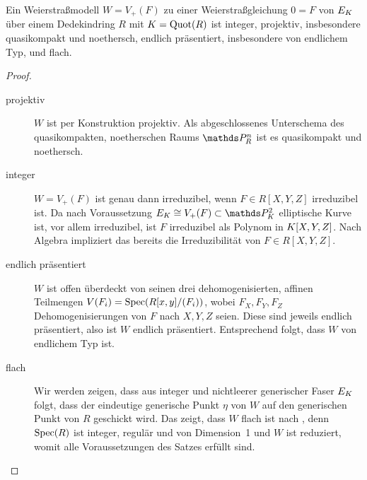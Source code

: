 \begin{Lemma}\label{thm:eigweierstrassmodelle}
  Ein Weierstraßmodell $W=V_+(F)$ zu einer Weierstraßgleichung $0=F$
  von $E_{K}$ über einem Dedekindring $R$ mit $K=\operatorname{Quot}(R)$ ist
  integer,
  projektiv, insbesondere quasikompakt und noethersch,
  endlich präsentiert, insbesondere von endlichem Typ, und
  flach.
  \begin{proof}
    \begin{description}
    \item[projektiv] $W$ ist per Konstruktion projektiv. Als
      abgeschlossenes Unterschema des quasikompakten, noetherschen Raums
      $\P_R^n$ ist es quasikompakt und noethersch.
    \item[integer]
      $W=V_+(F)$ ist genau dann irreduzibel, wenn $F\in R[X,Y,Z]$
      irreduzibel ist.
      Da nach Voraussetzung $E_\K\cong V_+(F)\subset\P_\K^2$
      elliptische Kurve ist, vor allem irreduzibel, ist $F$ irreduzibel
      als Polynom in $K[X,Y,Z]$. Nach Algebra impliziert das bereits
      die Irreduzibilität von $F\in R[X,Y,Z]$.
    \item[endlich präsentiert]
      $W$ ist offen überdeckt von seinen drei dehomogenisierten,
      affinen Teilmengen $V(F_i)=\operatorname{Spec}(R[x,y]/(F_i))$, wobei $F_X,F_Y,F_Z$
      Dehomogenisierungen von $F$ nach $X,Y,Z$ seien. Diese sind jeweils
      endlich präsentiert, also ist $W$ endlich präsentiert.
      Entsprechend folgt, dass $W$ von endlichem Typ ist.
    \item[flach]
      Wir werden zeigen, dass aus integer und nichtleerer generischer
      Faser $E_{K}$ folgt, dass der eindeutige generische Punkt $\eta$
      von $W$ auf den generischen Punkt von $R$ geschickt wird.
      Das zeigt, dass $W$ flach ist
      nach \cite[Proposition III.9.7]{hartshorne}, denn
      $\operatorname{Spec}(R)$ ist integer, regulär und von Dimension~1 und
      $W$ ist reduziert, womit alle Voraussetzungen des Satzes erfüllt
      sind.
      

\end{description}
\end{proof}
\end{Lemma}
